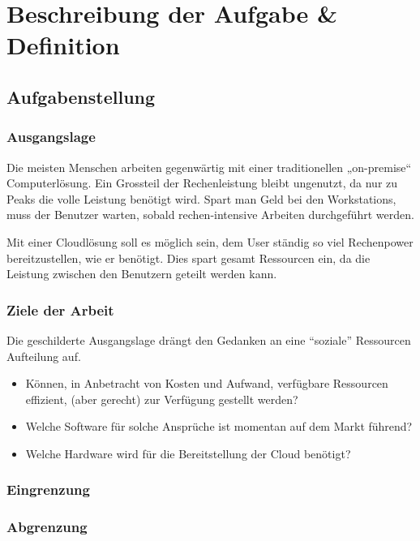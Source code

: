 \chapter{Beschreibung der Aufgabe \& Definition}

\section{Aufgabenstellung}


\subsection{Ausgangslage}
Die meisten Menschen arbeiten gegenwärtig mit einer traditionellen „on-premise“ Computerlösung.
Ein Grossteil der Rechenleistung bleibt ungenutzt, da nur zu Peaks die volle Leistung benötigt wird.
Spart man Geld bei den Workstations, muss der Benutzer warten, sobald rechen-intensive Arbeiten durchgeführt werden. 

Mit einer Cloudlösung soll es möglich sein, dem User ständig so viel Rechenpower bereitzustellen, wie er benötigt.
Dies spart gesamt Ressourcen ein, da die Leistung zwischen den Benutzern geteilt werden kann.

\subsection{Ziele der Arbeit}
Die geschilderte Ausgangslage drängt den Gedanken an eine “soziale” Ressourcen Aufteilung auf.

\begin{itemize}
	\item Können, in Anbetracht von Kosten und Aufwand, verfügbare Ressourcen effizient, (aber gerecht) zur Verfügung gestellt werden?
	\item Welche Software für solche Ansprüche ist momentan auf dem Markt führend?
	\item Welche Hardware wird für die Bereitstellung der Cloud benötigt?
\end{itemize}


\subsection{Eingrenzung}


\subsection{Abgrenzung}


